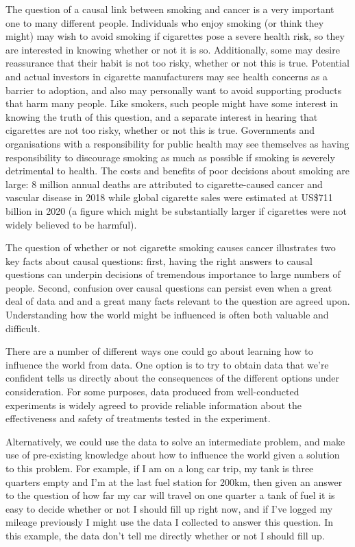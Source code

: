 The question of a causal link between smoking and cancer is a very important one to many different people. Individuals who enjoy smoking (or think they might) may wish to avoid smoking if cigarettes pose a severe health risk, so they are interested in knowing whether or not it is so. Additionally, some may desire reassurance that their habit is not too risky, whether or not this is true. Potential and actual investors in cigarette manufacturers may see health concerns as a barrier to adoption, and also may personally want to avoid supporting products that harm many people. Like smokers, such people might have some interest in knowing the truth of this question, and a separate interest in hearing that cigarettes are not too risky, whether or not this is true. Governments and organisations with a responsibility for public health may see themselves as having responsibility to discourage smoking as much as possible if smoking is severely detrimental to health. The costs and benefits of poor decisions about smoking are large: 8 million annual deaths are attributed to cigarette-caused cancer and vascular disease in 2018 \citep{world_health_organisation_tobacco_nodate} while  global cigarette sales were estimated at US\$711 billion in 2020 \citep{noauthor_cigarettes_nodate} (a figure which might be substantially larger if cigarettes were not widely believed to be harmful).

The question of whether or not cigarette smoking causes cancer illustrates two key facts about causal questions: first, having the right answers to causal questions can underpin decisions of tremendous importance to large numbers of people. Second, confusion over causal questions can persist even when a great deal of data and and a great many facts relevant to the question are agreed upon. Understanding how the world might be influenced is often both valuable and difficult.

There are a number of different ways one could go about learning how to influence the world from data. One option is to try to obtain data that we're confident tells us directly about the consequences of the different options under consideration. For some purposes, data produced from well-conducted experiments is widely agreed to provide reliable information about the effectiveness and safety of treatments tested in the experiment. 

Alternatively, we could use the data to solve an intermediate problem, and make use of pre-existing knowledge about how to influence the world given a solution to this problem. For example, if I am on a long car trip, my tank is three quarters empty and I'm at the last fuel station for 200km, then given an answer to the question of how far my car will travel on one quarter a tank of fuel it is easy to decide whether or not I should fill up right now, and if I've logged my mileage previously I might use the data I collected to answer this question. In this example, the data don't tell me directly whether or not I should fill up. 

